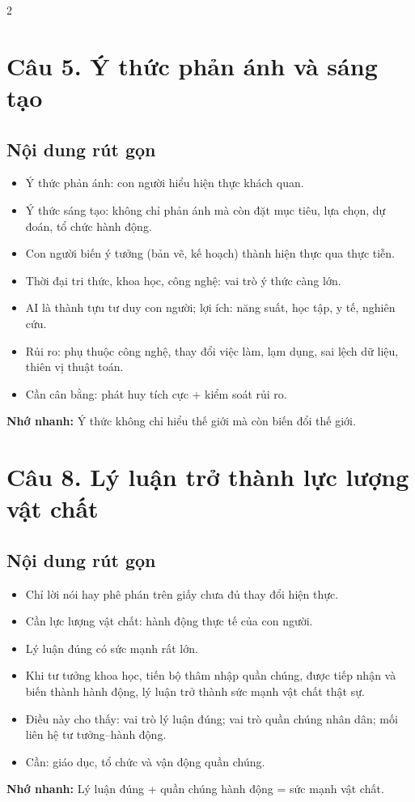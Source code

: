 \documentclass[9pt,a4paper]{extarticle}
\begin{document}
\begin{multicols*}{2}
\section*{Câu 5. Ý thức phản ánh và sáng tạo}
\subsection*{Nội dung rút gọn}
\begin{itemize}
  \item Ý thức phản ánh: con người hiểu hiện thực khách quan.
  \item Ý thức sáng tạo: không chỉ phản ánh mà còn đặt mục tiêu, lựa chọn, dự đoán, tổ chức hành động.
  \item Con người biến ý tưởng (bản vẽ, kế hoạch) thành hiện thực qua thực tiễn.
  \item Thời đại tri thức, khoa học, công nghệ: vai trò ý thức càng lớn.
  \item AI là thành tựu tư duy con người; lợi ích: năng suất, học tập, y tế, nghiên cứu.
  \item Rủi ro: phụ thuộc công nghệ, thay đổi việc làm, lạm dụng, sai lệch dữ liệu, thiên vị thuật toán.
  \item Cần cân bằng: phát huy tích cực + kiểm soát rủi ro.
\end{itemize}
\textbf{Nhớ nhanh:} Ý thức không chỉ hiểu thế giới mà còn biến đổi thế giới.

\section*{Câu 8. Lý luận trở thành lực lượng vật chất}
\subsection*{Nội dung rút gọn}
\begin{itemize}
  \item Chỉ lời nói hay phê phán trên giấy chưa đủ thay đổi hiện thực.
  \item Cần lực lượng vật chất: hành động thực tế của con người.
  \item Lý luận đúng có sức mạnh rất lớn.
  \item Khi tư tưởng khoa học, tiến bộ thâm nhập quần chúng, được tiếp nhận và biến thành hành động, lý luận trở thành sức mạnh vật chất thật sự.
  \item Điều này cho thấy: vai trò lý luận đúng; vai trò quần chúng nhân dân; mối liên hệ tư tưởng--hành động.
  \item Cần: giáo dục, tổ chức và vận động quần chúng.
\end{itemize}
\textbf{Nhớ nhanh:} Lý luận đúng + quần chúng hành động = sức mạnh vật chất.


\end{multicols*}
\end{document}
